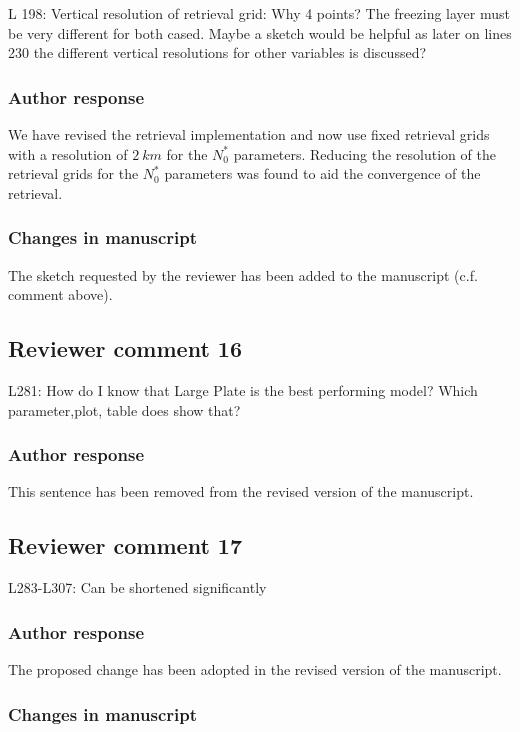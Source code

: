 L 198: Vertical resolution of retrieval grid: Why 4 points? The freezing layer
must be very different for both cased. Maybe a sketch would be helpful as later
on lines 230 the different vertical resolutions for other variables is discussed?

\subsubsection*{Author response}

We have revised the retrieval implementation and now use fixed retrieval grids
with a resolution of  $2\ \unit{km}$ for the $N_0^*$ parameters. Reducing the
resolution of the retrieval grids for the $N_0^*$ parameters was found to aid
the convergence of the retrieval.

\subsubsection*{Changes in manuscript}

The sketch requested by the reviewer has been added to the manuscript (c.f.
comment above).

\subsection{Reviewer comment 16}

L281: How do I know that Large Plate is the best performing model? Which parameter,plot, table does show that?

\subsubsection*{Author response}

This sentence has been removed from the revised version of the manuscript.

\subsection*{Reviewer comment 17}
L283-L307: Can be shortened significantly

\subsubsection*{Author response}

The proposed change has been adopted in the revised version of the manuscript.

\subsubsection*{Changes in manuscript}

